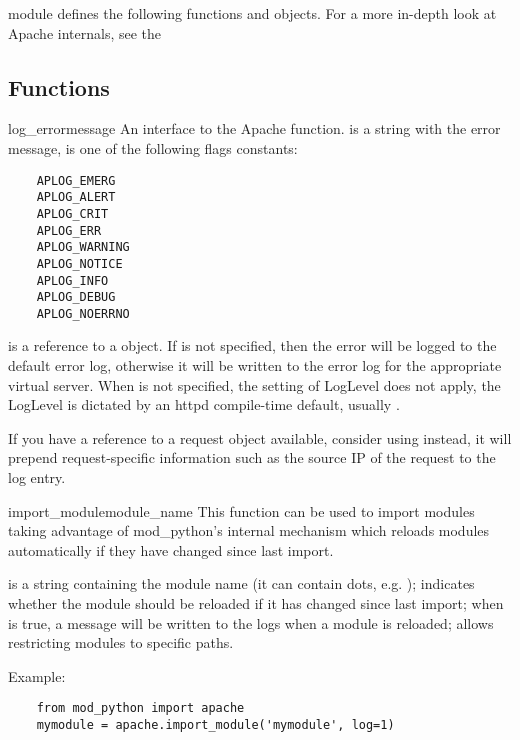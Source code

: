  module defines the following functions and
objects. For a more in-depth look at Apache internals, see the

\subsection{Functions\label{pyapi-apmeth}}

\begin{funcdesc}{log_error}{message}
  An interface to the Apache 
  function.  is a string with the error message,
   is one of the following flags constants:

  \begin{verbatim}
    APLOG_EMERG
    APLOG_ALERT
    APLOG_CRIT
    APLOG_ERR
    APLOG_WARNING
    APLOG_NOTICE
    APLOG_INFO
    APLOG_DEBUG
    APLOG_NOERRNO
  \end{verbatim}            
  
   is a reference to a  object. If
   is not specified, then the error will be logged to the
  default error log, otherwise it will be written to the error log for
  the appropriate virtual server. When  is not specified,
  the setting of LogLevel does not apply, the LogLevel is dictated by
  an httpd compile-time default, usually .

  If you have a reference to a request object available, consider using
   instead, it will prepend request-specific
  information such as the source IP of the request to the log entry.
\end{funcdesc}

\begin{funcdesc}{import_module}{module_name}
  This function can be used to import modules taking advantage of
  mod_python's internal mechanism which reloads modules automatically
  if they have changed since last import. 

   is a string containing the module name (it can
  contain dots, e.g. ); 
  indicates whether the module should be reloaded if it has changed since
  last import; when  is true, a message will be written to
  the logs when a module is reloaded;  allows restricting
  modules to specific paths.

  Example:

  \begin{verbatim}
    from mod_python import apache
    mymodule = apache.import_module('mymodule', log=1)
  \end{verbatim}
\end{funcdesc}


